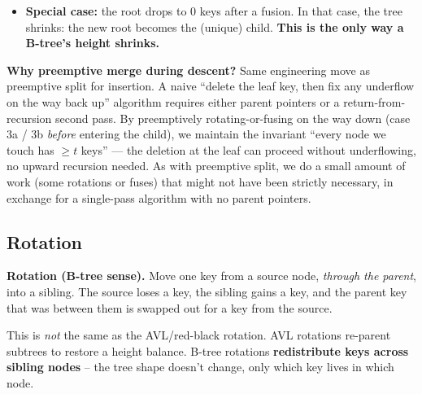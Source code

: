 \documentclass[11pt]{article}
\begin{document}
\begin{defnbox}
\begin{itemize}[leftmargin=*]
\begin{itemize}
              \item \textbf{3b.} $c_i$ has $t-1$ keys and both
                    immediate siblings have $t-1$ keys. \textbf{Fuse}
                    $c_i$ with one sibling and the separator key from
                    $x$.
          \end{itemize}
          Then descend into the (now-safe) child and recurse.
    \item \textbf{Special case:} the root drops to 0 keys after a
          fusion. In that case, the tree shrinks: the new root
          becomes the (unique) child. \textbf{This is the only way a
          B-tree's height shrinks.}
\end{itemize}
\end{defnbox}

\begin{notebox}
\textbf{Why preemptive merge during descent?} Same engineering move
as preemptive split for insertion. A naive ``delete the leaf key,
then fix any underflow on the way back up'' algorithm requires either
parent pointers or a return-from-recursion second pass. By
preemptively rotating-or-fusing on the way down (case 3a / 3b
\emph{before} entering the child), we maintain the invariant ``every
node we touch has $\ge t$ keys'' --- the deletion at the leaf can
proceed without underflowing, no upward recursion needed. As with
preemptive split, we do a small amount of work (some rotations or
fuses) that might not have been strictly necessary, in exchange for
a single-pass algorithm with no parent pointers.
\end{notebox}

\subsection*{Rotation}

\begin{defnbox}
\textbf{Rotation (B-tree sense).} Move one key from a source node, \emph{through the parent}, into a sibling. The source loses a key, the sibling gains a key, and the parent key that was between them is swapped out for a key from the source.
\end{defnbox}

\begin{ideabox}
This is \emph{not} the same as the AVL/red-black rotation. AVL rotations re-parent subtrees to restore a height balance. B-tree rotations \textbf{redistribute keys across sibling nodes} -- the tree shape doesn't change, only which key lives in which node.
\end{ideabox}
\end{document}
